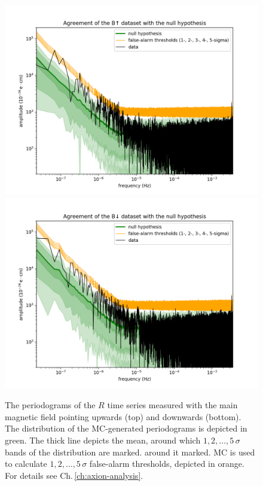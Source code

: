 \begin{figure}[h!]
  \centering
  \includegraphics[width=0.9\linewidth]{gfx/axions/winddeltah4mm_Bup_detection.png}
  \includegraphics[width=0.9\linewidth]{gfx/axions/winddeltah4mm_Bdown_detection.png}
  \caption{The periodograms of the $R$ time series measured with the main magnetic field pointing upwards (top) and downwards (bottom). The distribution of the MC-generated periodograms is depicted in green. The thick line depicts the mean, around which $1,2,…,5\,\sigma$ bands of the distribution are marked. around it marked. MC is used to calculate $1,2,…,5\,\sigma$ false-alarm thresholds, depicted in orange. For details see Ch.\,\ref{ch:axion-analysis}.}\label{fig:app_wind_periodogram}
\end{figure}

